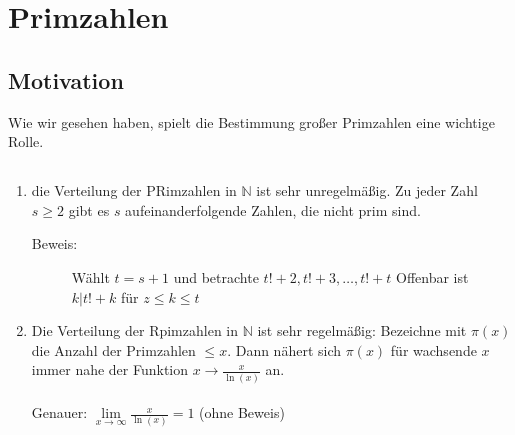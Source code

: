 \section{Primzahlen}
%
%
%
\subsection{Motivation}
Wie wir gesehen haben, spielt die Bestimmung großer Primzahlen eine wichtige Rolle.
%
%
%
\subsection{\qquad}
  \begin{enumerate}[label={(\alph*)}]
	\item die Verteilung der PRimzahlen in $\mathbb{N}$ ist sehr unregelmäßig. Zu jeder Zahl $s\geq 2$ gibt es $s$ 			
		aufeinanderfolgende Zahlen, die nicht prim sind.
	\begin{description}
		\item [Beweis:] Wählt $t = s +1$ und betrachte $t!+2, t!+3, \dotsc, t!+t$ Offenbar ist $k|t!+k$ für $z \leq k \leq t$
	\end{description}
	\item Die Verteilung der Rpimzahlen in $\mathbb{N}$ ist sehr regelmäßig: Bezeichne mit $\pi(x)$  die Anzahl der Primzahlen 			$\leq x$. Dann nähert sich $\pi(x)$ für wachsende $x$ immer nahe der Funktion $x \rightarrow \frac{x}{\ln(x)}$ an. 		\\
		\qquad\\	
		Genauer: $\lim\limits_{x \to \infty} \frac{x}{\ln(x)} = 1$ (ohne Beweis)
\end{enumerate}
